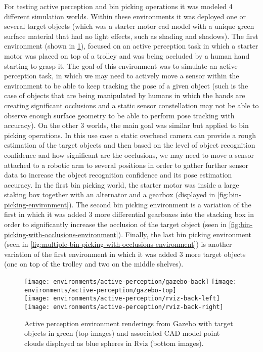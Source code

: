 For testing active perception and bin picking operations it was modeled 4 different simulation worlds. Within these environments it was deployed one or several target objects (which was a starter motor \gls{cad} model with a unique green surface material that had no light effects, such as shading and shadows). The first environment (shown in \cref{fig:active-perception-environment}), focused on an active perception task in which a starter motor was placed on top of a trolley and was being occluded by a human hand starting to grasp it. The goal of this environment was to simulate an active perception task, in which we may need to actively move a sensor within the environment to be able to keep tracking the pose of a given object (such is the case of objects that are being manipulated by humans in which the hands are creating significant occlusions and a static sensor constellation may not be able to observe enough surface geometry to be able to perform pose tracking with accuracy). On the other 3 worlds, the main goal was similar but applied to bin picking operations. In this use case a static overhead camera can provide a rough estimation of the target objects and then based on the level of object recognition confidence and how significant are the occlusions, we may need to move a sensor attached to a robotic arm to several positions in order to gather further sensor data to increase the object recognition confidence and its pose estimation accuracy. In the first bin picking world, the starter motor was inside a large staking box together with an alternator and a gearbox (displayed in \cref{fig:bin-picking-environment}). The second bin picking environment is a variation of the first in which it was added 3 more differential gearboxes into the stacking box in order to significantly increase the occlusion of the target object (seen in \cref{fig:bin-picking-with-occlusions-environment}). Finally, the last bin picking environment (seen in \cref{fig:multiple-bin-picking-with-occlusions-environment}) is another variation of the first environment in which it was added 3 more target objects (one on top of the trolley and two on the middle shelves).

\begin{figure}
	\centering
	\texttt{[image: environments/active-perception/gazebo-back]}
	\texttt{[image: environments/active-perception/gazebo-top]}\\
	\texttt{[image: environments/active-perception/rviz-back-left]}
	\texttt{[image: environments/active-perception/rviz-back-right]}
	\caption{Active perception environment renderings from Gazebo with target objects in green (top images) and associated CAD model point clouds displayed as blue spheres in Rviz (bottom images).}
	\label{fig:active-perception-environment}
\end{figure}

